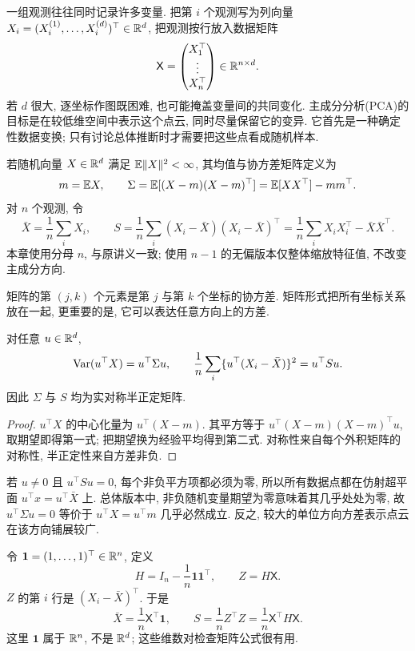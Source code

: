 \label{chap:pca}

一组观测往往同时记录许多变量. 把第 $i$ 个观测写为列向量 $X_i=(X_i^{(1)},\ldots,X_i^{(d)})^\top\in\mathbb R^d$, 把观测按行放入数据矩阵
\[
 \mathsf X=\begin{pmatrix}X_1^\top\\\vdots\\X_n^\top\end{pmatrix}\in\mathbb R^{n\times d}.
\]
若 $d$ 很大, 逐坐标作图既困难, 也可能掩盖变量间的共同变化. 主成分分析(PCA)的目标是在较低维空间中表示这个点云, 同时尽量保留它的变异. 它首先是一种确定性数据变换; 只有讨论总体推断时才需要把这些点看成随机样本. 

\begin{definition}[总体与样本协方差]
若随机向量 $X\in\mathbb R^d$ 满足 $\mathbb E\lVert X\rVert^2<\infty$, 其均值与协方差矩阵定义为
\[
 m=\mathbb E X,\qquad \Sigma=\mathbb E[(X-m)(X-m)^\top]
       =\mathbb E[XX^\top]-mm^\top.
\]
对 $n$ 个观测, 令
\[
 \bar X=\frac1n\sum_iX_i,\qquad
 S=\frac1n\sum_i(X_i-\bar X)(X_i-\bar X)^\top
  =\frac1n\sum_iX_iX_i^\top-\bar X\bar X^\top.
\]
本章使用分母 $n$, 与原讲义一致; 使用 $n-1$ 的无偏版本仅整体缩放特征值, 不改变主成分方向. 
\end{definition}
矩阵的第 $(j,k)$ 个元素是第 $j$ 与第 $k$ 个坐标的协方差. 矩阵形式把所有坐标关系放在一起, 更重要的是, 它可以表达任意方向上的方差. 

\begin{proposition}[方向方差]
对任意 $u\in\mathbb R^d$, 
\[
 \operatorname{Var}(u^\top X)=u^\top\Sigma u,\qquad
 \frac1n\sum_i\{u^\top(X_i-\bar X)\}^2=u^\top Su.
\]
因此 $\Sigma$ 与 $S$ 均为实对称半正定矩阵. 
\end{proposition}
\begin{proof}
$u^\top X$ 的中心化量为 $u^\top(X-m)$. 其平方等于 $u^\top(X-m)(X-m)^\top u$, 取期望即得第一式; 把期望换为经验平均得到第二式. 对称性来自每个外积矩阵的对称性, 半正定性来自方差非负. 
\end{proof}
若 $u\ne0$ 且 $u^\top Su=0$, 每个非负平方项都必须为零, 所以所有数据点都在仿射超平面 $u^\top x=u^\top\bar X$ 上. 总体版本中, 非负随机变量期望为零意味着其几乎处处为零, 故 $u^\top\Sigma u=0$ 等价于 $u^\top X=u^\top m$ 几乎必然成立. 反之, 较大的单位方向方差表示点云在该方向铺展较广. 

令 $\mathbf1=(1,\ldots,1)^\top\in\mathbb R^n$, 定义
\[
 H=I_n-\frac1n\mathbf1\mathbf1^\top,\qquad Z=H\mathsf X.
\]
$Z$ 的第 $i$ 行是 $(X_i-\bar X)^\top$. 于是
\[
 \bar X=\frac1n\mathsf X^\top\mathbf1,\qquad
 S=\frac1n Z^\top Z=\frac1n\mathsf X^\top H\mathsf X.
\]
这里 $\mathbf1$ 属于 $\mathbb R^n$, 不是 $\mathbb R^d$; 这些维数对检查矩阵公式很有用. 

